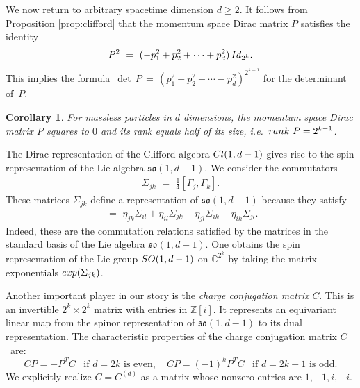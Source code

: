 \documentclass[english]{ourlematema}
\numberwithin{theorem}{section}
\newtheorem{corollary}[theorem]{Corollary}
\theoremstyle{definition}
\newcommand{\CC}{\mathbb{C}}
\newcommand{\ZZ}{\mathbb{Z}}
\begin{document}
We now return to arbitrary spacetime dimension $d \geq 2$.
It follows from Proposition \ref{prop:clifford} that the
 momentum space Dirac matrix $P$ satisfies the identity
\begin{equation}
\label{eq:P^2}
P^2 \,\,=\,\, (-p_1^2 + p_2^2 + \cdots + p_{d}^2)\,{\rm Id}_{2^k}.
\end{equation}
This implies the formula
$\,\det \,P\,=\, (p_1^2 - p_2^2 - \cdots - p_{d}^2)^{2^{k - 1}}$
for the determinant of~$P$.

\begin{corollary} \label{cor:rankP}
For massless particles in $d$ dimensions, the momentum space Dirac matrix  $P$ 
squares to $0$
and its rank equals half of its size, 
i.e.\ ${\rm rank} \,\,P = 2^{k - 1}$. 
\end{corollary}

The Dirac representation of the Clifford algebra ${\rm Cl}(1,d-1)$ gives rise
to the spin representation of the Lie algebra $\mathfrak{so}(1,d-1)$.
We consider the commutators
\begin{align}\label{lie algebra rep}
    \Sigma_{jk}\,\,=\,\,\frac{1}{4}[\Gamma_j,\Gamma_k].
\end{align}
These matrices $\Sigma_{jk}$ define a representation of $\mathfrak{so}(1,d-1)$ 
because they satisfy
\begin{align}
    [\Sigma_{ij},\Sigma_{kl}]\,\,=\,\,\eta_{jk}\Sigma_{il}+\eta_{il}\Sigma_{jk}-\eta_{jl}\Sigma_{ik}-\eta_{ik}\Sigma_{jl}.
\end{align}
Indeed, these are the commutation relations satisfied by the
matrices in the
standard basis of the Lie algebra $\mathfrak{so}(1,d-1)$.
One obtains the spin representation of the Lie group
${\rm SO}(1,d-1)$ on $\CC^{2^k}$ by taking
the matrix exponentials ${\rm exp}(\Sigma_{jk})$.

Another important player in our story is the \textit{charge conjugation matrix} $C$. 
This is an invertible $2^k \times 2^k$ matrix with entries in $\ZZ[i]$.
It represents an equivariant  linear map from the spinor representation of $\mathfrak{so}(1,d - 1)$
 to its dual representation.  
 The characteristic properties of the charge conjugation matrix $C$~are:
\begin{equation}
\label{eq:Cproperties}
CP = -P^TC \,\,\, \text{ if $d=2k$ is even}, \quad CP = (-1)^kP^TC  \,\,\, \text{ if $d=2k+1$ is odd}.
\end{equation}
We explicitly realize $C = C^{(d)}$ as a matrix
 whose nonzero entries are $1,-1,i,-i$.
 
\end{document}
